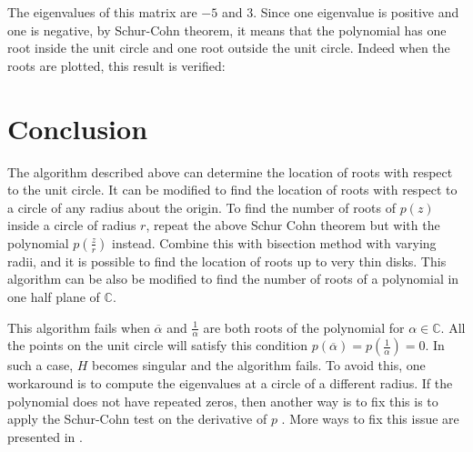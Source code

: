 \documentclass[twoside]{article}
\newcommand*\conj[1]{\overline{#1}}
\theoremstyle{plain}
\theoremstyle{definition}
\theoremstyle{remark}
\begin{document}
The eigenvalues of this matrix are \(-5\) and \(3\). Since one eigenvalue is positive and one is negative, by Schur-Cohn theorem, it means that the polynomial has one root inside the unit circle and one root outside the unit circle. Indeed when the roots are plotted, this result is verified:

\clearpage
\section{Conclusion}

The algorithm described above can determine the location of roots with respect to the unit circle. It can be modified to find the location of roots with respect to a circle of any radius about the origin. To find the number of roots of \(p(z)\) inside a circle of radius \(r\), repeat the above Schur Cohn theorem but with the polynomial \(p(\frac{z}{r})\) instead. Combine this with bisection method with varying radii, and it is possible to find the location of roots up to very thin disks. This algorithm can be also be modified to find the number of roots of a polynomial in one half plane of \(\mathbb{C}\). 

This algorithm fails when \(\conj{\alpha}\) and \(\frac{1}{\alpha}\) are both roots of the polynomial for  \(\alpha \in \mathbb{C}\). All the points on the unit circle will satisfy this condition \(p(\conj{\alpha}) = p(\frac{1}{\alpha}) = 0\). In such a case, \(H\) becomes singular and the algorithm fails.  To avoid this, one workaround is to compute the eigenvalues at a circle of a different radius. If the polynomial does not have repeated zeros, then another way is to fix this is to apply the Schur-Cohn test on the derivative of \(p\) \cite{zero_loc_herm}. More ways to fix this issue are presented in \cite{revisited}.


\nocite{zero_loc_schur_cohn}

{}

\end{document}
